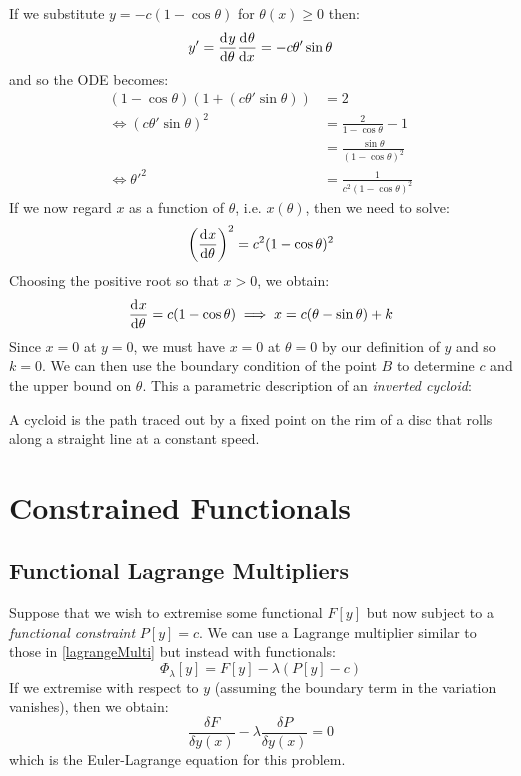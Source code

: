 \documentclass[../main.tex]{subfiles}
\begin{document}
\begin{example}
  If we substitute $y = -c(1 - \cos \theta)$ for $\theta(x) \geq 0$ then:
  \[
    y' = \deriv{y}{\theta} \deriv{\theta}{x} = -c \theta' \sin \theta
  \]
  and so the ODE becomes:
  \begin{align*}
    (1 - \cos \theta)(1 + (c\theta' \sin \theta)) &= 2 \\
    \iff (c \theta' \sin \theta)^2 &= \frac{2}{1 - \cos \theta} - 1 \\
                                   &= \frac{\sin \theta}{(1 - \cos \theta)^2} \\
    \iff {\theta'}^2 &= \frac{1}{c^2(1 - \cos \theta)^2}
  \end{align*}
  If we now regard $x$ as a function of $\theta$, i.e. $x(\theta)$, then we need to solve:
  \[
    \left(\deriv{x}{\theta}\right)^2 = c^2(1 - \cos \theta)^2
  \]
  Choosing the positive root so that $x > 0$, we obtain:
  \[
    \deriv{x}{\theta} = c(1 - \cos \theta) \implies x = c(\theta - \sin \theta) + k
  \]
  Since $x = 0$ at $y = 0$, we must have $x = 0$ at $\theta = 0$ by our definition of $y$ and so $k = 0$.
  We can then use the boundary condition of the point $B$ to determine $c$ and the upper bound on $\theta$.
  This a parametric description of an \textit{inverted cycloid}:
  \begin{center}
  \end{center}
  A cycloid is the path traced out by a fixed point on the rim of a disc that rolls along a straight line at a constant speed.
\end{example}
\section{Constrained Functionals}
\subsection{Functional Lagrange Multipliers}
Suppose that we wish to extremise some functional $F[y]$ but now subject to a \textit{functional constraint} $P[y] = c$.
We can use a Lagrange multiplier similar to those in \cref{lagrangeMulti} but instead with functionals:
\[
  \Phi_{\lambda} [y] = F[y] - \lambda(P[y] - c)
\]
If we extremise with respect to $y$ (assuming the boundary term in the variation vanishes), then we obtain:
\[
  \frac{\delta F}{\delta y(x)} - \lambda \frac{\delta P}{\delta y(x)} = 0
\]
which is the Euler-Lagrange equation for this problem.
\end{document}
